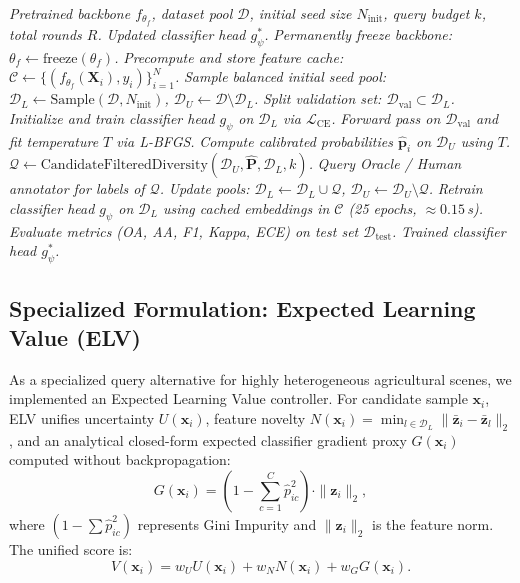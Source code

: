 \documentclass[conference,letterpaper]{IEEEtran}
\begin{document}
\begin{algorithm}[!t]
\caption{Adaptive Active Learning Adaptation Loop}
\label{alg:al_loop}
\begin{algorithmic}[1]
\REQUIRE \textit{Pretrained backbone $f_{\theta_f}$, dataset pool $\mathcal{D}$, initial seed size $N_{\text{init}}$, query budget $k$, total rounds $R$.}
\ENSURE \textit{Updated classifier head $g_\psi^*$.}
\STATE \textit{Permanently freeze backbone: $\theta_f \leftarrow \text{freeze}(\theta_f)$.}
\STATE \textit{Precompute and store feature cache: $\mathcal{C} \leftarrow \{ (f_{\theta_f}(\mathbf{X}_i), y_i) \}_{i=1}^N$.}
\STATE \textit{Sample balanced initial seed pool: $\mathcal{D}_L \leftarrow \text{Sample}(\mathcal{D}, N_{\text{init}})$, $\mathcal{D}_U \leftarrow \mathcal{D} \setminus \mathcal{D}_L$.}
\STATE \textit{Split validation set: $\mathcal{D}_{\text{val}} \subset \mathcal{D}_L$.}
\STATE \textit{Initialize and train classifier head $g_\psi$ on $\mathcal{D}_L$ via $\mathcal{L}_{\text{CE}}$.}
    \STATE \textit{Forward pass on $\mathcal{D}_{\text{val}}$ and fit temperature $T$ via L-BFGS.}
    \STATE \textit{Compute calibrated probabilities $\hat{\mathbf{p}}_i$ on $\mathcal{D}_U$ using $T$.}
    \STATE \textit{$\mathcal{Q} \leftarrow \text{CandidateFilteredDiversity}(\mathcal{D}_U, \hat{\mathbf{P}}, \mathcal{D}_L, k)$.}
    \STATE \textit{Query Oracle / Human annotator for labels of $\mathcal{Q}$.}
    \STATE \textit{Update pools: $\mathcal{D}_L \leftarrow \mathcal{D}_L \cup \mathcal{Q}$, $\mathcal{D}_U \leftarrow \mathcal{D}_U \setminus \mathcal{Q}$.}
    \STATE \textit{Retrain classifier head $g_\psi$ on $\mathcal{D}_L$ using cached embeddings in $\mathcal{C}$ (25 epochs, $\approx 0.15$\,s).}
    \STATE \textit{Evaluate metrics (OA, AA, F1, Kappa, ECE) on test set $\mathcal{D}_{\text{test}}$.}
\ENDFOR
\RETURN \textit{Trained classifier head $g_\psi^*$.}
\end{algorithmic}
\end{algorithm}

\subsection{Specialized Formulation: Expected Learning Value (ELV)}
As a specialized query alternative for highly heterogeneous agricultural scenes, we implemented an Expected Learning Value controller. For candidate sample $\mathbf{x}_i$, ELV unifies uncertainty $U(\mathbf{x}_i)$, feature novelty $N(\mathbf{x}_i) = \min_{l \in \mathcal{D}_L} \|\bar{\mathbf{z}}_i - \bar{\mathbf{z}}_l\|_2$, and an analytical closed-form expected classifier gradient proxy $G(\mathbf{x}_i)$ computed without backpropagation:
\begin{equation}
G(\mathbf{x}_i) = \left( 1 - \sum_{c=1}^C \hat{p}_{ic}^2 \right) \cdot \|\mathbf{z}_i\|_2,
\end{equation}
where $(1 - \sum \hat{p}_{ic}^2)$ represents Gini Impurity and $\|\mathbf{z}_i\|_2$ is the feature norm. The unified score is:
\begin{equation}
V(\mathbf{x}_i) = w_U U(\mathbf{x}_i) + w_N N(\mathbf{x}_i) + w_G G(\mathbf{x}_i).
\end{equation}
\end{document}
